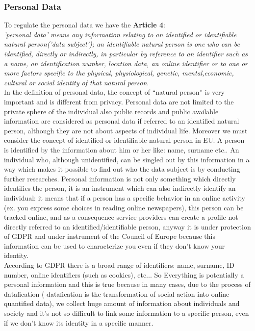 \subsubsection{Personal Data}
To regulate the personal data we have the \textbf{Article 4}:\\
\textit{ 'personal data' means any information relating to an identified or identifiable natural person('data subject'); an identifiable natural person is one who can be identified, directly or indirectly, in particular by reference to an identifier such as a name, an identification number, location data, an online identifier or to one or more factors specific to the physical, physiological, genetic, mental,economic, cultural or social identity of that natural person}.\\
In the definition of personal data, the concept of “natural person” is very important and is different from privacy. Personal data are not limited to the private sphere of the individual also public records and public available information are considered as personal data if referred to an identified natural person, although they are not about aspects of individual life.
Moreover we must consider the concept of identified or identifiable natural person in EU. A person is identified by the information about him or her like: name, surname etc..
An individual who, although unidentified, can be singled out by this information in a way which makes it possible to find out who the data subject is by conducting further researches. Personal information is not only something which directly identifies the person, it is an instrument which can also indirectly identify an individual: it means that if a person has a specific behavior in an online activity (ex. you express some choices in reading online newspapers), this person can be tracked online, and as a consequence service providers can create a profile not directly referred to an identified/identifiable person, anyway it is under protection of GDPR and under instrument of the Council of Europe because this information can be used to characterize you even if they don’t know your identity.\\
According to GDPR there is a broad range of identifiers: name, surname, ID number, online identifiers (such as cookies), etc...
So Everything is potentially a personal information and this is true because in many cases, due to the process of datafication ( datafication is the transformation of social action into online quantified data), we collect huge amount of information about individuals and society and it’s not so difficult to link some information to a specific person, even if we don’t know its identity in a specific manner.\\
